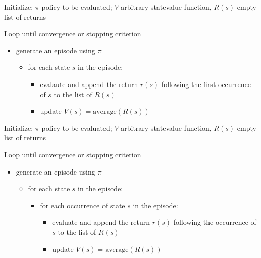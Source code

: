 \documentclass[letterpaper,10pt,english]{jupyterBook}
\begin{document}
\sphinxAtStartPar
{}

\sphinxAtStartPar
Initialize: \(\pi\) policy to be evaluated; \(V\) arbitrary state\sphinxhyphen{}value function, \(R(s)\) empty list of returns

\sphinxAtStartPar
Loop until convergence or stopping criterion
\begin{itemize}
\item {} 
\sphinxAtStartPar
generate an episode using \(\pi\)
\begin{itemize}
\item {} 
\sphinxAtStartPar
for each state \(s\) in the episode:
\begin{itemize}
\item {} 
\sphinxAtStartPar
evalaute and append the return \(r(s)\) following the first occurrence of \(s\) to the list of \(R(s)\)

\item {} 
\sphinxAtStartPar
update \(V(s) = \text{average}(R(s))\)

\end{itemize}

\end{itemize}

\end{itemize}

\sphinxAtStartPar
{}

\sphinxAtStartPar
Initialize: \(\pi\) policy to be evaluated; \(V\) arbitrary state\sphinxhyphen{}value function, \(R(s)\) empty list of returns

\sphinxAtStartPar
Loop until convergence or stopping criterion
\begin{itemize}
\item {} 
\sphinxAtStartPar
generate an episode using \(\pi\)
\begin{itemize}
\item {} 
\sphinxAtStartPar
for each state \(s\) in the episode:
\begin{itemize}
\item {} 
\sphinxAtStartPar
for each occurrence of state \(s\) in the episode:
\begin{itemize}
\item {} 
\sphinxAtStartPar
evaluate and append the return \(r(s)\) following the occurrence of \(s\) to the list of \(R(s)\)

\item {} 
\sphinxAtStartPar
update \(V(s) = \text{average}(R(s))\)

\end{itemize}

\end{itemize}

\end{itemize}

\end{itemize}
\end{document}
